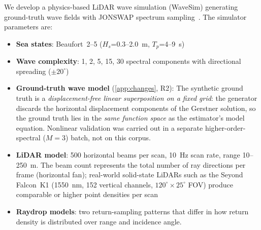 \documentclass[review]{elsarticle}
\begin{document}
We develop a physics-based LiDAR wave simulation (WaveSim) generating
ground-truth wave fields with JONSWAP spectrum
sampling~\citep{hasselmann1973}.  The simulator parameters are:
\begin{itemize}
  \item \textbf{Sea states}: Beaufort~2--5
    ($H_s$=0.3--2.0~m, $T_p$=4--9~s)
  \item \textbf{Wave complexity}: 1, 2, 5, 15, 30 spectral components
    with directional spreading ($\pm 20^\circ$)
  \item \textbf{Ground-truth wave model} (\ref{app:changes}, R2): The synthetic ground truth is a \emph{displacement-free
    linear superposition on a fixed grid}: the generator discards the
    horizontal displacement components of the Gerstner solution, so the
    ground truth lies in the \emph{same function space} as the estimator's
    model equation. Nonlinear validation was carried out in a separate
    higher-order-spectral ($M{=}3$) batch, not on this corpus.
  \item \textbf{LiDAR model}: 500 horizontal beams per scan,
    10~Hz scan rate, range 10--250~m.  The beam count represents the
    total number of ray directions per frame (horizontal fan);
    real-world solid-state LiDARs such as the Seyond Falcon~K1
    (1550~nm, 152 vertical channels, $120^\circ \times 25^\circ$ FOV)
    produce comparable or higher point densities per scan
  \item \textbf{Raydrop models}: two return-sampling patterns that differ
    in how return density is distributed over range and incidence angle.

\end{itemize}
\end{document}
